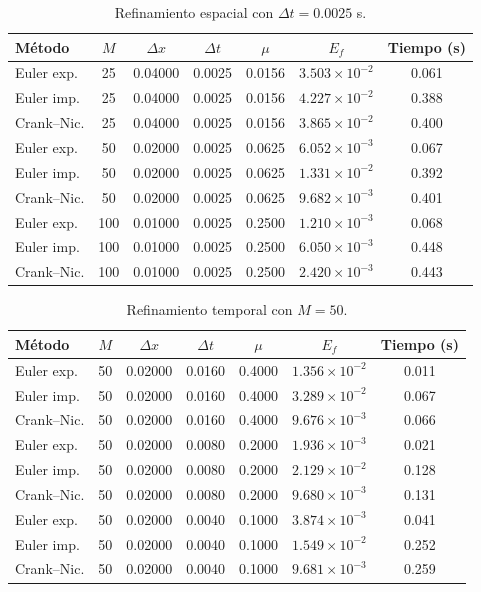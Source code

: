 \documentclass[12pt, letterpaper]{article}
\begin{document}
\begin{table}[H]
\centering
\caption{Refinamiento espacial con \(\Delta t = 0.0025\) s.}
\label{tab:espacial}
\begin{tabular}{lcccccc}
\toprule
Método & \(M\) & \(\Delta x\) & \(\Delta t\) & \(\mu\) & \(E_f\) & Tiempo (s) \\
\midrule
Euler exp. & 25 & 0.04000 & 0.0025 & 0.0156 & \(3.503\times10^{-2}\) & 0.061 \\
Euler imp. & 25 & 0.04000 & 0.0025 & 0.0156 & \(4.227\times10^{-2}\) & 0.388 \\
Crank--Nic. & 25 & 0.04000 & 0.0025 & 0.0156 & \(3.865\times10^{-2}\) & 0.400 \\
Euler exp. & 50 & 0.02000 & 0.0025 & 0.0625 & \(6.052\times10^{-3}\) & 0.067 \\
Euler imp. & 50 & 0.02000 & 0.0025 & 0.0625 & \(1.331\times10^{-2}\) & 0.392 \\
Crank--Nic. & 50 & 0.02000 & 0.0025 & 0.0625 & \(9.682\times10^{-3}\) & 0.401 \\
Euler exp. & 100 & 0.01000 & 0.0025 & 0.2500 & \(1.210\times10^{-3}\) & 0.068 \\
Euler imp. & 100 & 0.01000 & 0.0025 & 0.2500 & \(6.050\times10^{-3}\) & 0.448 \\
Crank--Nic. & 100 & 0.01000 & 0.0025 & 0.2500 & \(2.420\times10^{-3}\) & 0.443 \\
\bottomrule
\end{tabular}
\end{table}

\begin{table}[H]
\centering
\caption{Refinamiento temporal con \(M=50\).}
\label{tab:temporal}
\begin{tabular}{lcccccc}
\toprule
Método & \(M\) & \(\Delta x\) & \(\Delta t\) & \(\mu\) & \(E_f\) & Tiempo (s) \\
\midrule
Euler exp. & 50 & 0.02000 & 0.0160 & 0.4000 & \(1.356\times10^{-2}\) & 0.011 \\
Euler imp. & 50 & 0.02000 & 0.0160 & 0.4000 & \(3.289\times10^{-2}\) & 0.067 \\
Crank--Nic. & 50 & 0.02000 & 0.0160 & 0.4000 & \(9.676\times10^{-3}\) & 0.066 \\
Euler exp. & 50 & 0.02000 & 0.0080 & 0.2000 & \(1.936\times10^{-3}\) & 0.021 \\
Euler imp. & 50 & 0.02000 & 0.0080 & 0.2000 & \(2.129\times10^{-2}\) & 0.128 \\
Crank--Nic. & 50 & 0.02000 & 0.0080 & 0.2000 & \(9.680\times10^{-3}\) & 0.131 \\
Euler exp. & 50 & 0.02000 & 0.0040 & 0.1000 & \(3.874\times10^{-3}\) & 0.041 \\
Euler imp. & 50 & 0.02000 & 0.0040 & 0.1000 & \(1.549\times10^{-2}\) & 0.252 \\
Crank--Nic. & 50 & 0.02000 & 0.0040 & 0.1000 & \(9.681\times10^{-3}\) & 0.259 \\
\bottomrule
\end{tabular}
\end{table}
\end{document}
